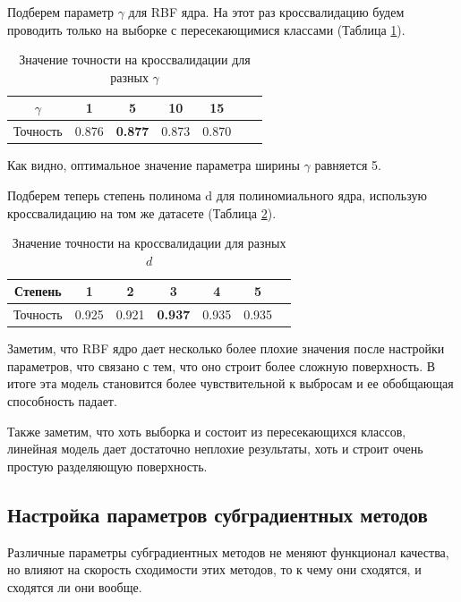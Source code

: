 \documentclass[12pt,fleqn,unicode]{article}
\begin{document}
Подберем параметр $\gamma$ для RBF ядра. На этот раз кроссвалидацию будем проводить только на
выборке с пересекающимися классами (Таблица \ref{tab7}).

\begin{table}[h!]
	\captionsetup{justification=centering}
	\centering
	\begin{tabular}{|c|c|c|c|c|c|c|}
	\hline
$\gamma$ & 1 & \textbf{5} & 10 & 15 \\ \hline
Точность & 0.876 & \textbf{0.877} & 0.873 & 0.870 \\ \hline
	\end{tabular}
	\caption{Значение точности на кроссвалидации для разных $\gamma$}
	\label{tab7}
\end{table}

Как видно, оптимальное значение параметра ширины $\gamma$ равняется 5.

Подберем теперь степень полинома d для полиномиального ядра, использую кроссвалидацию
на том же датасете (Таблица \ref{tab8}).

\begin{table}[h!]
	\captionsetup{justification=centering}
	\centering
	\begin{tabular}{|c|c|c|c|c|c|c|}
	\hline
Степень & 1 & 2 & \textbf{3} & 4 & 5 \\ \hline 
Точность & 0.925 & 0.921 & \textbf{0.937} & 0.935 & 0.935 \\ \hline
	\end{tabular}
	\caption{Значение точности на кроссвалидации для разных $d$}
	\label{tab8}
\end{table}

Заметим, что RBF ядро дает несколько более плохие значения после настройки параметров, 
что связано с тем, что оно строит более сложную поверхность. В итоге эта модель становится
более чувствительной к выбросам и ее обобщающая способность падает.

Также заметим, что хоть выборка и состоит из пересекающихся классов, линейная модель дает достаточно
неплохие результаты, хоть и строит очень простую разделяющую поверхность.

\subsection{Настройка параметров субградиентных методов}

Различные параметры субградиентных методов не меняют функционал качества, но 
влияют на скорость сходимости этих методов, то к чему они сходятся, и сходятся ли они вообще.
\end{document}
